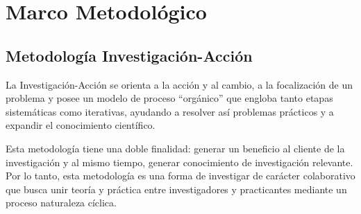 \chapter{\label{cap:3}Marco Metodol\'{o}gico}

	\section{Metodolog\'{i}a Investigaci\'{o}n-Acci\'{o}n}
	La Investigaci\'{o}n-Acci\'{o}n se orienta a la acci\'{o}n y al cambio, a la focalizaci\'{o}n de un problema y posee un modelo de proceso ``org\'{a}nico'' que engloba tanto etapas sistem\'{a}ticas como iterativas, ayudando a resolver as\'{i} problemas pr\'{a}cticos y a expandir el conocimiento cient\'{i}fico.

	Esta metodolog\'{i}a tiene una doble finalidad: generar un beneficio al cliente de la investigaci\'{o}n y al mismo tiempo, generar conocimiento de investigaci\'{o}n relevante. Por lo tanto, esta metodolog\'{i}a es una forma de investigar de car\'{a}cter colaborativo que busca unir teor\'{i}a y pr\'{a}ctica entre investigadores y practicantes mediante un proceso naturaleza c\'{i}clica.


